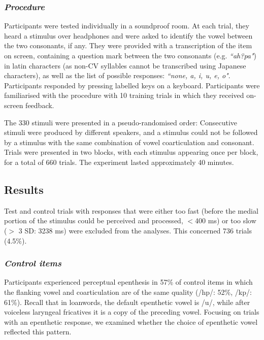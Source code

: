 \subsubsection{\textit{Procedure}}

Participants were tested individually in a soundproof room. At each trial, they heard a stimulus over headphones and were asked to identify the vowel between the two consonants, if any. They were provided with a transcription of the item on screen, containing a question mark between the two consonants (e.g. \textit{``ah?pa"}) in latin characters (as non-CV syllables cannot be transcribed using Japanese characters), as well as the list of possible responses: \textit{``none, a, i, u, e, o"}. Participants responded by pressing labelled keys on a keyboard. Participants were familiarised with the procedure with 10 training trials in which they received on-screen feedback. 

The 330 stimuli were presented in a pseudo-randomised order: Consecutive stimuli were produced by different speakers, and a stimulus could not be followed by a stimulus with the same combination of vowel coarticulation and consonant. Trials were presented in two blocks, with each stimulus appearing once per block, for a total of 660 trials. The experiment lasted approximately 40 minutes. 

\subsection{Results}

Test and control trials with responses that were either too fast (before the medial portion of the stimulus could be perceived and processed, $<$400 ms) or too slow ($>$ 3 SD: 3238 ms) were excluded from the analyses. This concerned 736 trials (4.5\%).

\subsubsection{\textit{Control items}}

Participants experienced perceptual epenthesis in 57\% of control items in which the flanking vowel and coarticulation are of the same quality (/hp/: 52\%, /kp/: 61\%). Recall that in loanwords, the default epenthetic vowel is /u/, while after voiceless laryngeal fricatives it is a copy of the preceding vowel. Focusing on trials with an epenthetic response, we examined whether the choice of epenthetic vowel reflected this pattern.

